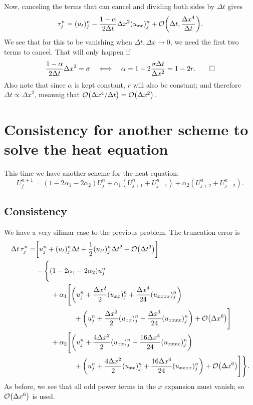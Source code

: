 \documentclass[11pt,letter, swedish, english
]{article}
\newcommand{\Dx}{\ensuremath{\Delta{x}}}
\newcommand{\Dt}{\ensuremath{\Delta{t}}}
\begin{document}
Now, canceling the terms that can cancel and dividing both sides by
$\Dt$ gives
\begin{equation}
\tau_j^n=(u_t)_j^n-\frac{1-\alpha}{2\Dt}\Dx^2(u_{xx})_j^n
+\order{\Dt, \frac{\Dx^4}{\Dt}}.
\end{equation}
We see that for this to be vanishing when $\Dt, \Dx\to0$, we need the
first two terms to cancel. That will only happen if
\begin{equation}
\frac{1-\alpha}{2\Dt}\Dx^2=\sigma
\quad\Longleftrightarrow\quad
\alpha=1-2\frac{\sigma\Dt}{\Dx^2}=1-2r.
\qed
\end{equation}
Also note that since $\alpha$ is kept constant, $r$ will also be
constant; and therefore $\Dt\propto\Dx^2$, meannig that
$\order{\Dx^4/\Dt}=\order{\Dx^2}$.

\section{Consistency for another scheme to solve the heat equation}
This time we have another scheme for the heat equation:
\begin{equation}
U_{j}^{n+1}=(1-2\alpha_1-2\alpha_2)U_{j}^{n}
+\alpha_1(U_{j+1}^n+U_{j-1}^n)+\alpha_2(U_{j+2}^n+U_{j-2}^n).
\end{equation}

\subsection{Consistency}
We have a very silimar case to the previous problem. The truncation
error is
\begin{equation}
\begin{aligned}
\Dt\,\tau_j^n=& \qty[u_j^n+(u_t)_j^n\Dt+\frac{1}{2}(u_{tt})_j^n\Dt^2+\order{\Dt^3}]\\
&-\Bigg\{(1-2\alpha_1-2\alpha_2)u_j^n
\\ &\hspace{22pt}+\alpha_1\Bigg[
\qty(u_j^n+\frac{\Dx^2}{2}(u_{xx})_j^n+\frac{\Dx^4}{24}(u_{xxxx})_j^n)
\\ &\hspace{55pt}
+\qty(u_j^n+\frac{\Dx^2}{2}(u_{xx})_j^n+\frac{\Dx^4}{24}(u_{xxxx})_j^n)
+\order{\Dx^6}\Bigg]
\\ &\hspace{22pt}
+\alpha_2\Bigg[
\qty(u_j^n+\frac{4\Dx^2}{2}(u_{xx})_j^n+\frac{16\Dx^4}{24}(u_{xxxx})_j^n)
\\ &\hspace{55pt}
+\qty(u_j^n+\frac{4\Dx^2}{2}(u_{xx})_j^n+\frac{16\Dx^4}{24}(u_{xxxx})_j^n)
+\order{\Dx^6}\Bigg]
\Bigg\}.
\end{aligned}
\end{equation}
As before, we see that all odd power terms in the $x$ expansion must
vanish; so $\order{\Dx^6}$ is used. 
\end{document}
